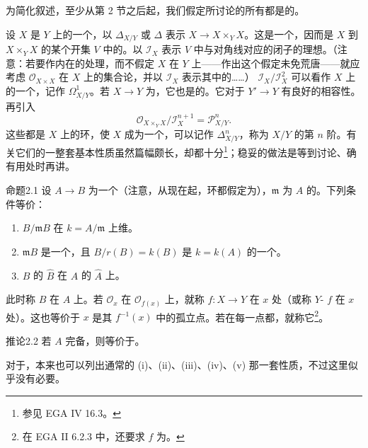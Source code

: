 为简化叙述，至少从第 2 节之后起，我们假定所讨论的所有都是的。

设 $X$ 是 $Y$ 上的一个，以 $\Delta_{X/Y}$ 或 $\Delta$ 表示 $X\to X\times_Y X$。这是一个，因而是 $X$ 到 $X\times_Y X$ 的某个开集 $V$ 中的。以 $\mathcal I_X$ 表示 $V$ 中与对角线对应的闭子的理想。（注意：若要作内在的处理，而不假定 $X$ 在 $Y$ 上——作出这个假定未免荒唐——就应考虑 $\mathcal O_{X\times X}$ 在 $X$ 上的集合论，并以 $\mathcal I_X$ 表示其中的……） $\mathcal I_X/\mathcal I_X^2$ 可以看作 $X$ 上的一个，记作 $\Omega^1_{X/Y}$。若 $X\to Y$ 为，它也是的。它对于 $Y'\to Y$ 有良好的相容性。再引入
\[
 \mathcal O_{X\times_Y X}/\mathcal I_X^{n+1}=\mathcal P^n_{X/Y}.
\]
这些都是 $X$ 上的环，使 $X$ 成为一个，可以记作 $\Delta^n_{X/Y}$，称为 $X/Y$ 的第 $n$ 阶。有关它们的一整套基本性质虽然篇幅颇长，却都十分\footnote{参见 EGA IV 16.3。}；稳妥的做法是等到讨论、确有用处时再讲。

\begin{SGAresult}{命题}{2.1}
设 $A\to B$ 为一个（注意，从现在起，环都假定为），$\mathfrak m$ 为 $A$ 的。下列条件等价：
\begin{enumerate}
\item[(i)] $B/\mathfrak m B$ 在 $k=A/\mathfrak m$ 上维。
\item[(ii)] $\mathfrak m B$ 是一个，且 $B/r(B)=k(B)$ 是 $k=k(A)$ 的一个。
\item[(iii)] $B$ 的 $\widehat B$ 在 $A$ 的 $\widehat A$ 上。
\end{enumerate}
\end{SGAresult}
此时称 $B$ 在 $A$ 上。若 $\mathcal O_x$ 在 $\mathcal O_{f(x)}$ 上，就称 $f\colon X\to Y$ 在 $x$ 处（或称 $Y$- $f$ 在 $x$ 处）。这也等价于 $x$ 是其 $f^{-1}(x)$ 中的孤立点。若在每一点都，就称它\footnote{在 EGA II 6.2.3 中，还要求 $f$ 为。}。
\begin{SGAresult}{推论}{2.2}
若 $A$ 完备，则等价于。
\end{SGAresult}
对于，本来也可以列出通常的 (i)、(ii)、(iii)、(iv)、(v) 那一套性质，不过这里似乎没有必要。

